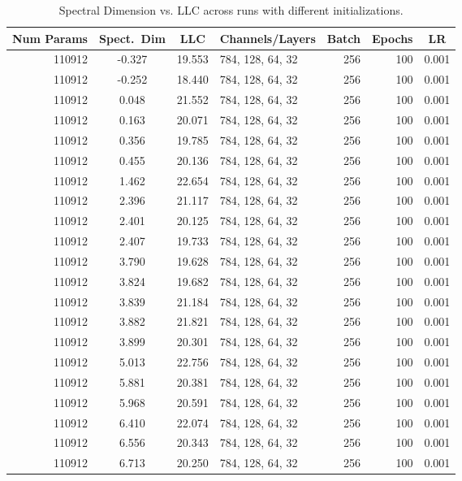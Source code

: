 \documentclass{article} %
\theoremstyle{definition}
\begin{document}
\newpage
\begin{table}[H]
\caption{Spectral Dimension vs. LLC across runs with different initializations.}
  \centering
  \begin{tabular}{r c c l r r c}
    \toprule
    Num Params & Spect.~Dim & LLC & Channels/Layers & Batch & Epochs & LR \\
    \midrule
    110912 & -0.327 & 19.553 & 784, 128, 64, 32 & 256 & 100 & 0.001 \\
    110912 & -0.252 & 18.440 & 784, 128, 64, 32 & 256 & 100 & 0.001 \\
    110912 & 0.048 & 21.552 & 784, 128, 64, 32 & 256 & 100 & 0.001 \\
    110912 & 0.163 & 20.071 & 784, 128, 64, 32 & 256 & 100 & 0.001 \\
    110912 & 0.356 & 19.785 & 784, 128, 64, 32 & 256 & 100 & 0.001 \\
    110912 & 0.455 & 20.136 & 784, 128, 64, 32 & 256 & 100 & 0.001 \\
    110912 & 1.462 & 22.654 & 784, 128, 64, 32 & 256 & 100 & 0.001 \\
    110912 & 2.396 & 21.117 & 784, 128, 64, 32 & 256 & 100 & 0.001 \\
    110912 & 2.401 & 20.125 & 784, 128, 64, 32 & 256 & 100 & 0.001 \\
    110912 & 2.407 & 19.733 & 784, 128, 64, 32 & 256 & 100 & 0.001 \\
    110912 & 3.790 & 19.628 & 784, 128, 64, 32 & 256 & 100 & 0.001 \\
    110912 & 3.824 & 19.682 & 784, 128, 64, 32 & 256 & 100 & 0.001 \\
    110912 & 3.839 & 21.184 & 784, 128, 64, 32 & 256 & 100 & 0.001 \\
    110912 & 3.882 & 21.821 & 784, 128, 64, 32 & 256 & 100 & 0.001 \\
    110912 & 3.899 & 20.301 & 784, 128, 64, 32 & 256 & 100 & 0.001 \\
    110912 & 5.013 & 22.756 & 784, 128, 64, 32 & 256 & 100 & 0.001 \\
    110912 & 5.881 & 20.381 & 784, 128, 64, 32 & 256 & 100 & 0.001 \\
    110912 & 5.968 & 20.591 & 784, 128, 64, 32 & 256 & 100 & 0.001 \\
    110912 & 6.410 & 22.074 & 784, 128, 64, 32 & 256 & 100 & 0.001 \\
    110912 & 6.556 & 20.343 & 784, 128, 64, 32 & 256 & 100 & 0.001 \\
    110912 & 6.713 & 20.250 & 784, 128, 64, 32 & 256 & 100 & 0.001 \\

\end{tabular}
\end{table}
\end{document}
